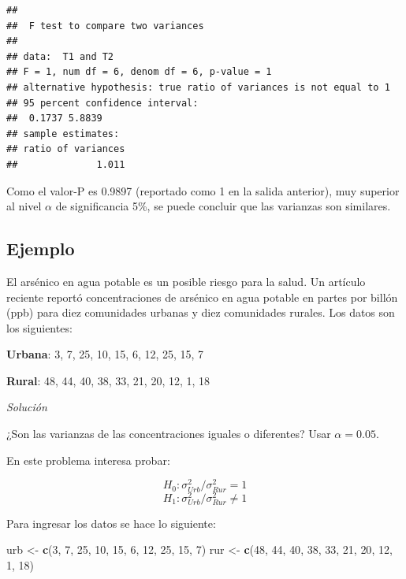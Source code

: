\documentclass[10pt,]{krantz}
\makeatletter
\newenvironment{Shaded}{\begin{snugshade}}{\end{snugshade}}
\newcommand{\KeywordTok}[1]{\textcolor[rgb]{0.13,0.29,0.53}{\textbf{#1}}}
\newcommand{\DecValTok}[1]{\textcolor[rgb]{0.00,0.00,0.81}{#1}}
\newcommand{\StringTok}[1]{\textcolor[rgb]{0.31,0.60,0.02}{#1}}
\newcommand{\NormalTok}[1]{#1}
\newenvironment{kframe}{%
\medskip{}
\setlength{\fboxsep}{.8em}
 \def\at@end@of@kframe{}%
 \ifinner\ifhmode%
  \def\at@end@of@kframe{\end{minipage}}%
  \begin{minipage}{\columnwidth}%
 \fi\fi%
 \def\FrameCommand##1{\hskip\@totalleftmargin \hskip-\fboxsep
 \colorbox{shadecolor}{##1}\hskip-\fboxsep
     \hskip-\linewidth \hskip-\@totalleftmargin \hskip\columnwidth}%
 \MakeFramed {\advance\hsize-\width
   \@totalleftmargin\z@ \linewidth\hsize
   \@setminipage}}%
 {\par\unskip\endMakeFramed%
 \at@end@of@kframe}
\renewenvironment{Shaded}{\begin{kframe}}{\end{kframe}}
\makeatother
\begin{document}
\begin{verbatim}
## 
##  F test to compare two variances
## 
## data:  T1 and T2
## F = 1, num df = 6, denom df = 6, p-value = 1
## alternative hypothesis: true ratio of variances is not equal to 1
## 95 percent confidence interval:
##  0.1737 5.8839
## sample estimates:
## ratio of variances 
##              1.011
\end{verbatim}

Como el valor-P es 0.9897 (reportado como 1 en la salida anterior), muy
superior al nivel \(\alpha\) de significancia 5\%, se puede concluir que
las varianzas son similares.

\subsection*{Ejemplo}\label{ejemplo-69}


El arsénico en agua potable es un posible riesgo para la salud. Un
artículo reciente reportó concentraciones de arsénico en agua potable en
partes por billón (ppb) para diez comunidades urbanas y diez comunidades
rurales. Los datos son los siguientes:

\textbf{Urbana}: 3, 7, 25, 10, 15, 6, 12, 25, 15, 7

\textbf{Rural}: 48, 44, 40, 38, 33, 21, 20, 12, 1, 18

\emph{Solución}

¿Son las varianzas de las concentraciones iguales o diferentes? Usar
\(\alpha=0.05\).

En este problema interesa probar:

\[H_0: \sigma_{Urb}^2 / \sigma_{Rur}^2 = 1\]
\[H_1: \sigma_{Urb}^2 / \sigma_{Rur}^2 \neq 1\]

Para ingresar los datos se hace lo siguiente:

\begin{Shaded}
\begin{Highlighting}[]
\NormalTok{urb <-}\StringTok{ }\KeywordTok{c}\NormalTok{(}\DecValTok{3}\NormalTok{, }\DecValTok{7}\NormalTok{, }\DecValTok{25}\NormalTok{, }\DecValTok{10}\NormalTok{, }\DecValTok{15}\NormalTok{, }\DecValTok{6}\NormalTok{, }\DecValTok{12}\NormalTok{, }\DecValTok{25}\NormalTok{, }\DecValTok{15}\NormalTok{, }\DecValTok{7}\NormalTok{)}
\NormalTok{rur <-}\StringTok{ }\KeywordTok{c}\NormalTok{(}\DecValTok{48}\NormalTok{, }\DecValTok{44}\NormalTok{, }\DecValTok{40}\NormalTok{, }\DecValTok{38}\NormalTok{, }\DecValTok{33}\NormalTok{, }\DecValTok{21}\NormalTok{, }\DecValTok{20}\NormalTok{, }\DecValTok{12}\NormalTok{, }\DecValTok{1}\NormalTok{, }\DecValTok{18}\NormalTok{)}
\end{Highlighting}
\end{Shaded}
\end{document}
